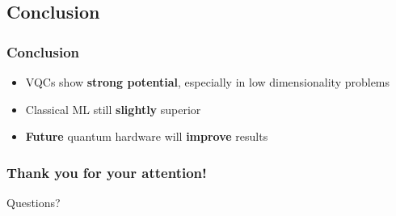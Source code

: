 \documentclass{beamer}
\begin{document}
\subsection{Conclusion}

\begin{frame}
	\frametitle{Conclusion}
	
	\begin{itemize}
		\item VQCs show \textbf{strong potential}, especially in low dimensionality problems
		\item Classical ML still \textbf{slightly} superior
		\item \textbf{Future} quantum hardware will \textbf{improve} results
	\end{itemize}
	
\end{frame}


\begin{frame}
	\frametitle{Thank you for your attention!}
	\center
	\Huge Questions?
\end{frame}
\end{document}

